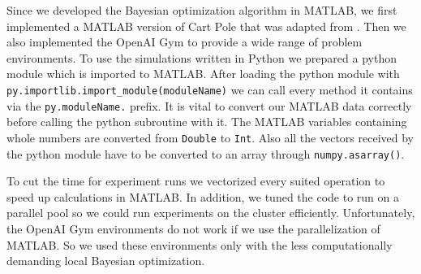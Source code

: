 Since we developed the Bayesian optimization algorithm in MATLAB, we first implemented a MATLAB version of Cart Pole that was adapted from \cite{joseCode}. Then we also implemented the OpenAI Gym \cite{DBLP:journals/corr/BrockmanCPSSTZ16} to provide a wide range of problem environments. To use the simulations written in Python we prepared a python module which is imported to MATLAB. After loading the python module with \verb|py.importlib.import_module(moduleName)| we can call every method it contains via the \verb|py.moduleName.| prefix. It is vital to convert our MATLAB data correctly before calling the python subroutine with it. The MATLAB variables containing whole numbers are converted from \verb|Double| to \verb|Int|. Also all the vectors received by the python module have to be converted to an array through \verb|numpy.asarray()|.

To cut the time for experiment runs we vectorized every suited operation to speed up calculations in MATLAB. In addition, we tuned the code to run on a parallel pool so we could run experiments on the cluster efficiently. Unfortunately, the OpenAI Gym environments do not work if we use the parallelization of MATLAB. So we used these environments only with the less computationally demanding local Bayesian optimization.\\

%


